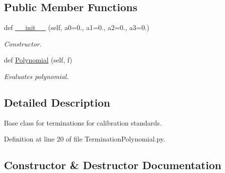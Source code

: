 \subsection*{Public Member Functions}
\begin{DoxyCompactItemize}
\item 
def \hyperlink{classSignalIntegrity_1_1Measurement_1_1CalKit_1_1Standards_1_1TerminationPolynomial_1_1TerminationPolynomial_a04c35e5daa8bdd47fdfe72060fe394d2}{\+\_\+\+\_\+init\+\_\+\+\_\+} (self, a0=0., a1=0., a2=0., a3=0.)
\begin{DoxyCompactList}\small\item\em Constructor. \end{DoxyCompactList}\item 
def \hyperlink{classSignalIntegrity_1_1Measurement_1_1CalKit_1_1Standards_1_1TerminationPolynomial_1_1TerminationPolynomial_ab268105477bd1955b7bfcb4450295fad}{Polynomial} (self, f)
\begin{DoxyCompactList}\small\item\em Evaluates polynomial. \end{DoxyCompactList}\end{DoxyCompactItemize}


\subsection{Detailed Description}
Base class for terminations for calibration standards. 

Definition at line 20 of file Termination\+Polynomial.\+py.



\subsection{Constructor \& Destructor Documentation}
\mbox{\label{classSignalIntegrity_1_1Measurement_1_1CalKit_1_1Standards_1_1TerminationPolynomial_1_1TerminationPolynomial_a04c35e5daa8bdd47fdfe72060fe394d2}} 
